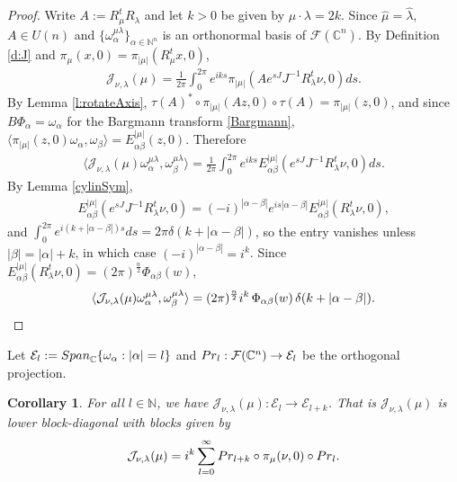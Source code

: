 \documentclass[11pt]{amsart}
\theoremstyle{plain}
\newtheorem{corollary}[theorem]{Corollary}
\theoremstyle{definition}
\theoremstyle{remark}
\numberwithin{equation}{section}
\def\cE{\mathcal{E}}
\def\cJ{\mathcal{J}}
\def\cF{\mathcal{F}}
\def\C{{\mathbb C}}%
\def\N{{\mathbb N}}%
\numberwithin{equation}{section}
\begin{document}
\begin{proof}
	Write $A:=R_\mu^tR_\lambda$ and let $k>0$ be given by $\mu\cdot\lambda=2k$. Since $\hat{\mu}=\hat{\lambda}$, $A\in U(n)$ and $\{\omega^{\mu\lambda}_\alpha\}_{\alpha\in \N^n}$ is an orthonormal basis of $\cF(\C^n)$.
	By Definition \ref{d:J} and $\pi_\mu(x, 0)=\pi_{|\mu|}(R_\mu^tx, 0)$,
	\begin{align*}
		\cJ_{\nu, \lambda}(\mu)=\frac{1}{2\pi}\int_0^{2\pi}e^{iks}\pi_{|\mu|}\left(Ae^{sJ}J^{-1}R_\lambda^t\nu, 0\right)ds.
	\end{align*}
	By Lemma \ref{l:rotateAxis}, $\tau(A)^*\circ \pi_{|\mu|}(Az, 0)\circ \tau(A)=\pi_{|\mu|}(z, 0)$, and since $B\Phi_\alpha=\omega_\alpha$ for the Bargmann transform \eqref{Bargmann}, $\langle \pi_{|\mu|}(z, 0)\omega_\alpha, \omega_\beta\rangle=E^{|\mu|}_{\alpha\beta}(z, 0)$. Therefore
	\begin{align*}
		\langle \cJ_{\nu, \lambda}(\mu)\omega^{\mu\lambda}_\alpha, \omega^{\mu\lambda}_\beta\rangle
		=\frac{1}{2\pi}\int_0^{2\pi}e^{iks}E^{|\mu|}_{\alpha\beta}\left(e^{sJ}J^{-1}R_\lambda^t\nu, 0\right)ds.
	\end{align*}
	By Lemma \ref{cylinSym},
	\begin{align*}
		E^{|\mu|}_{\alpha\beta}\left(e^{sJ}J^{-1}R_\lambda^t\nu, 0\right)=(-i)^{|\alpha-\beta|}e^{is|\alpha-\beta|}E^{|\mu|}_{\alpha\beta}\left(R_\lambda^t\nu, 0\right),
	\end{align*}
	and $\int_0^{2\pi}e^{i(k+|\alpha-\beta|)s}ds=2\pi\delta(k+|\alpha-\beta|)$, so the entry vanishes unless $|\beta|=|\alpha|+k$, in which case $(-i)^{|\alpha-\beta|}=i^k$. Since $E^{|\mu|}_{\alpha\beta}(R_\lambda^t\nu, 0)=(2\pi)^{\frac{n}{2}}\Phi_{\alpha\beta}(w)$,
	\begin{align*}
		\langle \cJ_{\nu, \lambda}(\mu)\omega^{\mu\lambda}_\alpha, \omega^{\mu\lambda}_\beta\rangle=(2\pi)^{\frac{n}{2}}i^k\,\Phi_{\alpha\beta}(w)\,\delta(k+|\alpha-\beta|).\qedhere
	\end{align*}
\end{proof}
Let $\cE_l:={ \rm Span}_{\C}\{\omega_\alpha: |\alpha|=l\}$ and ${{\rm Pr}}_l: \cF(\C^n)\to \cE_l$ be the orthogonal projection.
\begin{corollary}
	For all $l\in \N$, we have $\cJ_{\nu, \lambda}(\mu): \cE_l\to \cE_{l+k}$. That is $\cJ_{\nu, \lambda}(\mu)$ is lower block-diagonal with blocks given by
	\begin{align*}
		\cJ_{\nu, \lambda}(\mu)=i^k\sum_{l=0}^\infty {{\rm Pr}}_{l+k}\circ \pi_\mu(\nu, 0)\circ {{\rm Pr}}_{l}.
	\end{align*}
\end{corollary}
\end{document}
